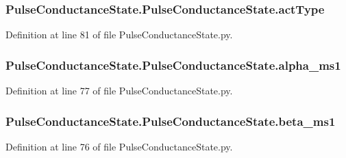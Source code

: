 \subsubsection[{\texorpdfstring{act\+Type}{actType}}]{\setlength{\rightskip}{0pt plus 5cm}Pulse\+Conductance\+State.\+Pulse\+Conductance\+State.\+act\+Type}\hypertarget{class_pulse_conductance_state_1_1_pulse_conductance_state_a0677d7b972a6f6a12abc666212a12297}{}\label{class_pulse_conductance_state_1_1_pulse_conductance_state_a0677d7b972a6f6a12abc666212a12297}


Definition at line 81 of file Pulse\+Conductance\+State.\+py.

\subsubsection[{\texorpdfstring{alpha\+\_\+ms1}{alpha_ms1}}]{\setlength{\rightskip}{0pt plus 5cm}Pulse\+Conductance\+State.\+Pulse\+Conductance\+State.\+alpha\+\_\+ms1}\hypertarget{class_pulse_conductance_state_1_1_pulse_conductance_state_a5fe4e2c9035df43a1e8eb9d66d669e14}{}\label{class_pulse_conductance_state_1_1_pulse_conductance_state_a5fe4e2c9035df43a1e8eb9d66d669e14}


Definition at line 77 of file Pulse\+Conductance\+State.\+py.

\subsubsection[{\texorpdfstring{beta\+\_\+ms1}{beta_ms1}}]{\setlength{\rightskip}{0pt plus 5cm}Pulse\+Conductance\+State.\+Pulse\+Conductance\+State.\+beta\+\_\+ms1}\hypertarget{class_pulse_conductance_state_1_1_pulse_conductance_state_a8ebc0c29d97fa09699d7dfb724e94f82}{}\label{class_pulse_conductance_state_1_1_pulse_conductance_state_a8ebc0c29d97fa09699d7dfb724e94f82}


Definition at line 76 of file Pulse\+Conductance\+State.\+py.

